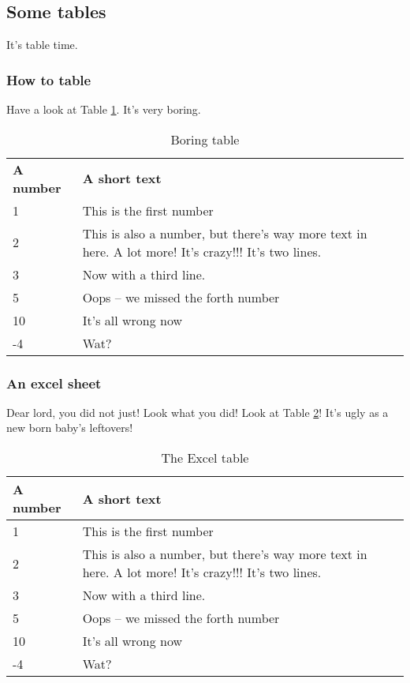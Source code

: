 \FloatBarrier
\subsection{Some tables}

It's table time.

\subsubsection{How to table}

Have a look at Table \ref{tab:boring}.
It's very boring.

\begin{table}[htbp]
	\centering
	\begin{tabularx}{\textwidth}{l X}
	\textbf{A number} & \textbf{A short text}  \\
	1 & This is the first number \\
	2 & This is also a number, but there's way more text in here. A lot more! It's crazy!!! It's two lines. \\
	3 & Now with a third line. \\
	5 & Oops -- we missed the forth number \\
	10 & It's all wrong now \\
	-4 & Wat?
	\end{tabularx}
	\caption{Boring table}
	\label{tab:boring}
\end{table}


\subsubsection{An excel sheet}

Dear lord, you did not just!
Look what you did!
Look at Table \ref{tab:excel}! 
It's ugly as a new born baby's leftovers!

\begin{table}[htbp]
	\centering
	\begin{tabularx}{\textwidth}{| l | X |}
	\hline
	\textbf{A number} & \textbf{A short text}  \\ \hline
	1 & This is the first number \\ \hline
	2 & This is also a number, but there's way more text in here. A lot more! It's crazy!!! It's two lines. \\ \hline
	3 & Now with a third line. \\ \hline
	5 & Oops -- we missed the forth number \\ \hline
	10 & It's all wrong now \\ \hline
	-4 & Wat? \\ \hline
	\end{tabularx}
	\caption{The Excel table}
	\label{tab:excel}
\end{table}


